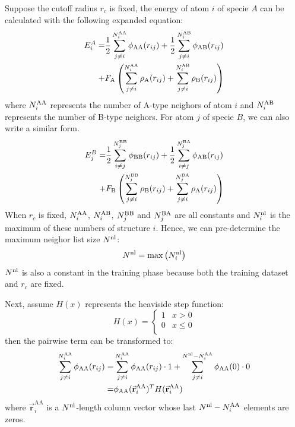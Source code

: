 \documentclass[final,3p,times]{elsarticle}
\begin{document}
Suppose the cutoff radius $r_c$ is fixed, the energy of atom $i$ of specie $A$ 
can be calculated with the following expanded equation:
\begin{align}
\label{eq:e_atom_phase_1}
E_{i}^{A} 
= & 
\frac{1}{2}\sum_{j\neq i}^{N_{i}^{\mathrm{AA}}}\phi_{\mathrm{AA}}(r_{ij}) +
\frac{1}{2}\sum_{j\neq i}^{N_{i}^{\mathrm{AB}}}\phi_{\mathrm{AB}}(r_{ij}) \nonumber \\
+ & F_{\mathrm{A}}\left(
    \sum_{j\neq i}^{N_{i}^{\mathrm{AA}}}{\rho_{\mathrm{A}}(r_{ij})} +
    \sum_{j\neq i}^{N_{i}^{\mathrm{AB}}}{\rho_{\mathrm{B}}(r_{ij})} 
\right)
\end{align}
where $N_{i}^{\mathrm{AA}}$ represents the number of A-type neighors of atom $i$ and 
$N_{i}^{\mathrm{AB}}$ represents the number of B-type neighors. For atom $j$ of specie $B$, we
can also write a similar form. 
\begin{align}
\label{eq:e_atom_phase_2}
E_{j}^{B} 
= & 
\frac{1}{2}\sum_{i \neq j}^{N_{j}^{\mathrm{BB}}}\phi_{\mathrm{BB}}(r_{ij}) +
\frac{1}{2}\sum_{i \neq j}^{N_{j}^{\mathrm{BA}}}\phi_{\mathrm{AB}}(r_{ij}) \nonumber \\
+ & F_{\mathrm{B}}\left(
    \sum_{j\neq i}^{N_{j}^{\mathrm{BB}}}{\rho_{\mathrm{B}}(r_{ij})} +
    \sum_{j\neq i}^{N_{j}^{\mathrm{BA}}}{\rho_{\mathrm{A}}(r_{ij})} 
\right)
\end{align}
When $r_c$ is fixed, $N_{i}^{\mathrm{AA}}$, $N_{i}^{\mathrm{AB}}$, $N_{j}^{\mathrm{BB}}$ and $N_{j}^{\mathrm{BA}}$ are all constants and
$N^{\mathrm{nl}}_i$ is the maximum of these numbers of structure $i$. Hence, we can 
pre-determine the maximum neighor list size $N^{\mathrm{nl}}$:
\begin{equation}
\label{eq:nnl}
N^{\mathrm{nl}} = \max{\left(N^{\mathrm{nl}}_i\right)}
\end{equation}
$N^{\mathrm{nl}}$ is also a constant in the training phase because both the training 
dataset and $r_c$ are fixed.

Next, assume $H(x)$ represents the heaviside step function:
\begin{equation}
\label{eq:heaviside}
H(x) = \begin{cases}
    1 & x > 0 \\
    0 & x \leq 0 \\
\end{cases}
\end{equation}
then the pairwise term can be transformed to:
\begin{align}
\sum_{j\neq i}^{N_{i}^{\mathrm{AA}}}\phi_{\mathrm{AA}}(r_{ij}) = &
\sum_{j\neq i}^{N_{i}^{\mathrm{AA}}}\phi_{\mathrm{AA}}(r_{ij}) \cdot 1 + 
\sum_{j\neq i}^{N^{\mathrm{nl}} - N_{i}^{\mathrm{AA}}}\phi_{\mathrm{AA}}(0) \cdot 0 \nonumber \\
= & \phi_{\mathrm{AA}}(\vec{\mathbf{r}}_{i}^{\mathrm{AA}})^T
H(\vec{\mathbf{r}}_{i}^{\mathrm{AA}})
\end{align}
where $\vec{\mathbf{r}}_{i}^{\mathrm{AA}}$ is a $N^{\mathrm{nl}}$-length column vector 
whose last $N^{\mathrm{nl}} - N_{i}^{\mathrm{AA}}$ elements are zeros.
\end{document}

